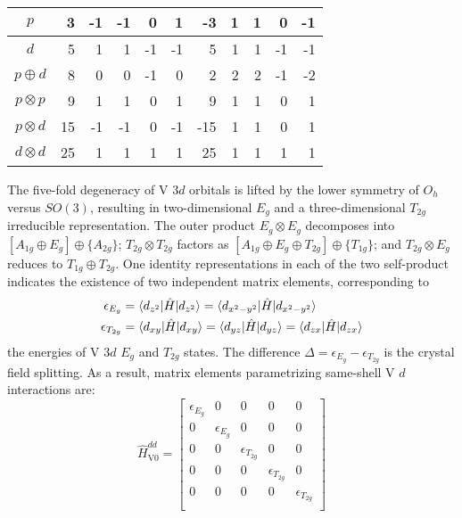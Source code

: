 \documentclass[twocolumn,showpacs,preprintnumbers,superscriptaddress,prb,floatfix,aps,10pt]{revtex4-1}
\newcommand*{\ham}{\hat{H}}
\begin{document}
\begin{table}
\begin{ruledtabular}
\begin{tabular*}{10cm}{llrrrrrrrrrr}
\multicolumn{2}{c}{$p$          } &  3  &     -1 &    -1  &     0  &     1  &  -3  &          1  &          1  &          0  &         -1  \\
\hline
\multicolumn{2}{c}{$d$          } &  5  &      1 &     1  &    -1  &    -1  &   5  &          1  &          1  &         -1  &         -1  \\
\multicolumn{2}{c}{$p \oplus  d$} &  8  &      0 &     0  &    -1  &     0  &   2  &          2  &          2  &         -1  &         -2  \\
\multicolumn{2}{c}{$p \otimes p$} &  9  &      1 &     1  &     0  &     1  &   9  &          1  &          1  &          0  &          1  \\
\multicolumn{2}{c}{$p \otimes d$} & 15  &     -1 &    -1  &     0  &    -1  & -15  &          1  &          1  &          0  &          1  \\
\multicolumn{2}{c}{$d \otimes d$} & 25  &      1 &     1  &     1  &     1  &  25  &          1  &          1  &          1  &          1  \\
\end{tabular*}
\end{ruledtabular}
\end{table}
%
The five-fold degeneracy of V 3$d$ orbitals is lifted by the lower symmetry of $O_h$ versus $SO(3)$, resulting in two-dimensional $E_g$ and a three-dimensional $T_{2g}$ irreducible representation. The outer product $E_g \otimes E_g$ decomposes into $[A_{1g} \oplus E_g] \oplus \{A_{2g}\}$; $T_{2g} \otimes T_{2g}$ factors as $[A_{1g} \oplus E_{g} \oplus T_{2g}] \oplus \{T_{1g}\}$; and $T_{2g} \otimes E_g$ reduces to $T_{1g} \oplus T_{2g}$. One identity representations in each of the two self-product indicates the existence of two independent matrix elements, corresponding to 
\begin{align}
\epsilon_{E_g} &
= \braket{d_{z^2}      | \ham | d_{z^2}} 
= \braket{d_{x^2-y^2}  | \ham | d_{x^2-y^2}  } \\
\epsilon_{T_{2g}} &
= \braket{d_{xy} | \ham | d_{xy} } 
= \braket{d_{yz} | \ham | d_{yz} }
= \braket{d_{zx} | \ham | d_{zx} }
\end{align}
the energies of V 3$d$ $E_g$ and $T_{2g}$ states. The difference $\Delta = \epsilon_{E_g} - \epsilon_{T_{2g}}$ is the crystal field splitting. As a result, matrix elements parametrizing same-shell V $d$ interactions are:
%
\begin{equation}
\label{eq:0dd}
\ham_{\textrm{V0}}^{dd} =
\begin{bmatrix}
 \epsilon_{E_g} & 0 & 0 & 0 & 0 \\
 0 & \epsilon_{E_g} & 0 & 0 & 0 \\
 0 & 0 & \epsilon_{T_{2g}} & 0 & 0 \\
 0 & 0 & 0 & \epsilon_{T_{2g}} & 0 \\
 0 & 0 & 0 & 0 & \epsilon_{T_{2g}} \\
\end{bmatrix}
\end{equation}
\end{document}
